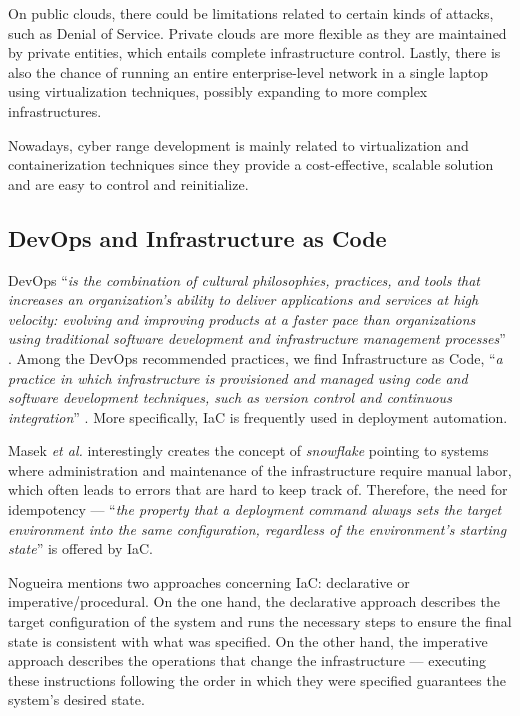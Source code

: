 On public clouds, there could be limitations related to certain kinds of attacks, such as Denial of Service. Private clouds are more flexible as they are maintained by private entities, which entails complete infrastructure control. Lastly, there is also the chance of running an entire enterprise-level network in a single laptop using virtualization techniques, possibly expanding to more complex infrastructures.

Nowadays, cyber range development is mainly related to virtualization and containerization techniques since they provide a cost-effective, scalable solution and are easy to control and reinitialize.

\subsection{DevOps and Infrastructure as Code} \label{sec:devops_and_iac}

DevOps ``\textit{is the combination of cultural philosophies, practices, and tools that increases an organization's ability to deliver applications and services at high velocity: evolving and improving products at a faster pace than organizations using traditional software development and infrastructure management processes}'' \cite{aws_what_is_devops_ref}. Among the DevOps recommended practices, we find Infrastructure as Code, ``\textit{a practice in which infrastructure is provisioned and managed using code and software development techniques, such as version control and continuous integration}'' \cite{aws_what_is_devops_iac_ref}. More specifically, IaC is frequently used in deployment automation.

Masek \textit{et al.} \cite{unleashing_full_potential_of_ansible_ref} interestingly creates the concept of \textit{snowflake} pointing to systems where administration and maintenance of the infrastructure require manual labor, which often leads to errors that are hard to keep track of. Therefore, the need for idempotency --- ``\textit{the property that a deployment command always sets the target environment into the same configuration, regardless of the environment's starting state}'' is offered by IaC.

Nogueira \cite{automating_open_source_up_ref} mentions two approaches concerning IaC: declarative or imperative/procedural. On the one hand, the declarative approach describes the target configuration of the system and runs the necessary steps to ensure the final state is consistent with what was specified. On the other hand, the imperative approach describes the operations that change the infrastructure — executing these instructions following the order in which they were specified guarantees the system's desired state. 

